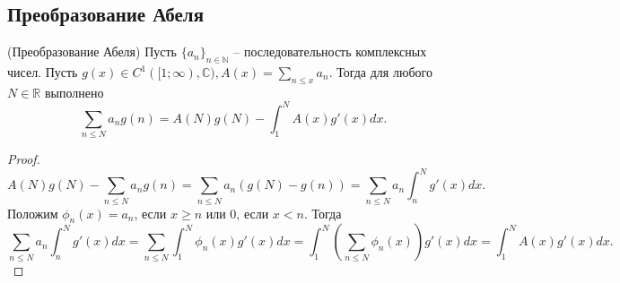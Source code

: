 \subsection{Преобразование Абеля}
\begin{lemma}(Преобразование Абеля) \label{l3_Abel_transform}
	Пусть $\lbrace a_n \rbrace_{n \in \mathbb{N}}$ -- последовательность комплексных чисел. Пусть $\displaystyle g(x) \in C^1([1; \infty), \mathbb{C}), A(x) = \sum\limits_{n \leq x} a_n$. Тогда для любого $N \in \mathbb{R}$ выполнено
	$$\sum_{n \leq N} a_n g(n) = A(N) g(N) - \int_{1}^{N} A(x) g'(x) dx.$$
\end{lemma}
\begin{proof}
	$$A(N) g(N)- \sum_{n \leq N} a_n g(n) = \sum_{n \leq N} a_n (g(N) - g(n)) = \sum_{n \leq N} a_n \int_{n}^{N} g'(x) dx.$$
	Положим $\phi_n(x)= a_n$, если $x \geq n$ или 0, если $x < n$. Тогда 
	$$\sum_{n \leq N} a_n \int_{n}^{N} g'(x) dx = \sum_{n \leq N} \int_{1}^{N} \phi_n(x) g'(x) dx = \int_{1}^{N} \left( \sum_{n \leq N} \phi_n(x) \right) g'(x) dx = \int_{1}^{N} A(x) g'(x) dx.$$
\end{proof}


